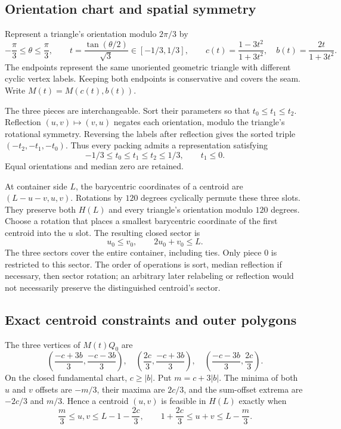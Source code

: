 \documentclass[11pt]{article}
\begin{document}
\subsection{Orientation chart and spatial symmetry}

Represent a triangle's orientation modulo $2\pi/3$ by
\begin{equation}\label{eq:chart}
 -\frac\pi3\le\theta\le\frac\pi3,\qquad
 t=\frac{\tan(\theta/2)}{\sqrt3}\in[-1/3,1/3],\qquad
 c(t)=\frac{1-3t^2}{1+3t^2},\quad b(t)=\frac{2t}{1+3t^2}.
\end{equation}
The endpoints represent the same unoriented geometric triangle with different cyclic vertex labels. Keeping both endpoints is conservative and covers the seam. Write $M(t)=M(c(t),b(t))$.

The three pieces are interchangeable. Sort their parameters so that $t_0\le t_1\le t_2$. Reflection $(u,v)\mapsto(v,u)$ negates each orientation, modulo the triangle's rotational symmetry. Reversing the labels after reflection gives the sorted triple $(-t_2,-t_1,-t_0)$. Thus every packing admits a representation satisfying
\begin{equation}\label{eq:orientation-domain}
 -1/3\le t_0\le t_1\le t_2\le1/3,\qquad t_1\le0.
\end{equation}
Equal orientations and median zero are retained.

At container side $L$, the barycentric coordinates of a centroid are $(L-u-v,u,v)$. Rotations by $120$ degrees cyclically permute these three slots. They preserve both $H(L)$ and every triangle's orientation modulo $120$ degrees. Choose a rotation that places a smallest barycentric coordinate of the first centroid into the $u$ slot. The resulting closed sector is
\begin{equation}\label{eq:sector}
 u_0\le v_0,\qquad 2u_0+v_0\le L.
\end{equation}
The three sectors cover the entire container, including ties. Only piece $0$ is restricted to this sector. The order of operations is sort, median reflection if necessary, then sector rotation; an arbitrary later relabeling or reflection would not necessarily preserve the distinguished centroid's sector.

\subsection{Exact centroid constraints and outer polygons}

The three vertices of $M(t)Q_0$ are
\[
 \left(\frac{-c+3b}{3},\frac{-c-3b}{3}\right),\quad
 \left(\frac{2c}{3},\frac{-c+3b}{3}\right),\quad
 \left(\frac{-c-3b}{3},\frac{2c}{3}\right).
\]
On the closed fundamental chart, $c\ge|b|$. Put $m=c+3|b|$. The minima of both $u$ and $v$ offsets are $-m/3$, their maxima are $2c/3$, and the sum-offset extrema are $-2c/3$ and $m/3$. Hence a centroid $(u,v)$ is feasible in $H(L)$ exactly when
\begin{equation}\label{eq:centroid-constraints}
 \frac m3\le u,v\le L-1-\frac{2c}3,\qquad
 1+\frac{2c}3\le u+v\le L-\frac m3.
\end{equation}
\end{document}
